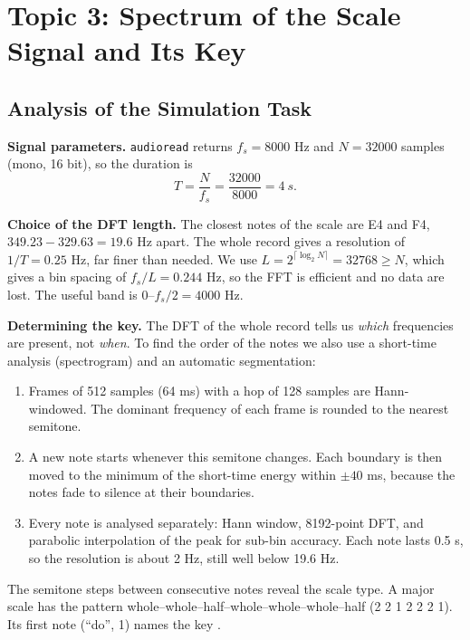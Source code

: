 \documentclass[12pt, a4paper]{article}
\def\text#1{#1}%
\begin{document}
\section{Topic 3: Spectrum of the Scale Signal and Its Key}

\subsection{Analysis of the Simulation Task}

\textbf{Signal parameters.} \texttt{audioread} returns $f_s=8000$ Hz and $N=32000$ samples (mono, 16 bit), so the duration is
\begin{equation}
    T=\frac{N}{f_s}=\frac{32000}{8000}=4\ \text{s}.
\end{equation}

\textbf{Choice of the DFT length.} The closest notes of the scale are E4 and F4, $349.23-329.63=19.6$ Hz apart. The whole record gives a resolution of $1/T=0.25$ Hz, far finer than needed. We use $L=2^{\lceil\log_2N\rceil}=32768\ge N$, which gives a bin spacing of $f_s/L=0.244$ Hz, so the FFT is efficient and no data are lost. The useful band is $0$--$f_s/2=4000$ Hz.

\textbf{Determining the key.} The DFT of the whole record tells us \emph{which} frequencies are present, not \emph{when}. To find the order of the notes we also use a short-time analysis (spectrogram) and an automatic segmentation:
\begin{enumerate}
    \item Frames of 512 samples (64 ms) with a hop of 128 samples are Hann-windowed. The dominant frequency of each frame is rounded to the nearest semitone.
    \item A new note starts whenever this semitone changes. Each boundary is then moved to the minimum of the short-time energy within $\pm40$ ms, because the notes fade to silence at their boundaries.
    \item Every note is analysed separately: Hann window, 8192-point DFT, and parabolic interpolation of the peak \cite{smith} for sub-bin accuracy. Each note lasts 0.5 s, so the resolution is about 2 Hz, still well below 19.6 Hz.
\end{enumerate}
The semitone steps between consecutive notes reveal the scale type. A major scale has the pattern whole--whole--half--whole--whole--whole--half (2 2 1 2 2 2 1). Its first note (``do'', 1) names the key \cite{chen}.
\end{document}
